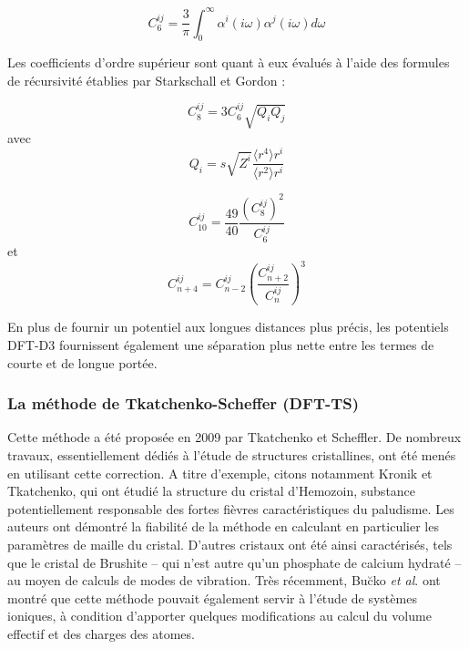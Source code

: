 {	\bigskip
	\begin{equation}
	C_{6}^{ij} = \frac{3}{\pi}\int_{0}^{\infty} \alpha^{i} (i\omega) \alpha^{j} (i\omega) d\omega
	\end{equation}
	\bigskip
	
	Les coefficients d’ordre supérieur sont quant à eux évalués à l’aide des formules de récursivité établies par Starkschall et Gordon \cite{starkschall1972error} : 
	
		\begin{equation}{C}_{8}^{ij} = 3{C}_{6}^{ij}\sqrt {{Q}_{i}{Q}_{j}}\end{equation} avec
		\begin{equation}Q_{i} = s\sqrt{Z^{i}} \frac{\langle r^{4}\rangle r^{i}}{\langle r^{2}\rangle r^{i}}\end{equation}
	
	
	
		\begin{equation} {C}_{10}^{ij}=\frac {49}{40} \frac{{\left({C}_{8}^{ij} \right)}^{2}}{{C}_{6}^{ij}} \end{equation} et
		\begin{equation} {C}_{n+4}^{ij}={C}_{n-2}^{ij}{\left(\frac{ {C}_{n+2}^{ij} }{ {C}_{n}^{ij} }\right)}^{3} \end{equation}
	
	
	En plus de fournir un potentiel aux longues distances plus précis, les potentiels DFT-D3 fournissent également une séparation plus nette entre les termes de courte et de longue portée. 
	
	
	\subsubsection{La méthode de Tkatchenko-Scheffer (DFT-TS)}
	
	Cette méthode a été proposée en 2009 par Tkatchenko et Scheffler\cite{tkatchenko2009accurate}. De nombreux travaux, essentiellement dédiés à l’étude de structures cristallines, ont été menés en utilisant cette correction. A titre d'exemple, citons notamment Kronik et Tkatchenko\cite{kronik2014understanding}, qui ont étudié la structure du cristal d'Hemozoin, substance potentiellement responsable des fortes fièvres caractéristiques du paludisme. Les auteurs ont démontré la fiabilité de la méthode en calculant en particulier les paramètres de maille du cristal. D’autres cristaux ont été ainsi caractérisés, tels que le cristal de Brushite -- qui n’est autre qu’un phosphate de calcium hydraté -- au moyen de calculs de modes de vibration. Très récemment, Bu\u{c}ko \textit{et al}. \cite{buvcko2014extending} ont montré que cette méthode pouvait également servir à l’étude de systèmes ioniques, à condition d’apporter quelques modifications au calcul du volume effectif et des charges des atomes. 
	
}
